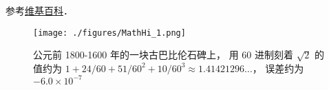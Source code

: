 
参考\href{https://en.wikipedia.org/wiki/History_of_mathematics}{维基百科}．

\begin{figure}[ht]
\centering
\texttt{[image: ./figures/MathHi\_1.png]}
\caption{公元前 1800-1600 年的一块古巴比伦石碑上， 用 60 进制刻着 $\sqrt{2}$ 的值约为 $1 + 24/60 + 51/60^2 + 10/60^3 \approx 1.41421296\dots$， 误差约为 $-6.0\times10^{-7}$} \label{MathHi_fig1}
\end{figure}
